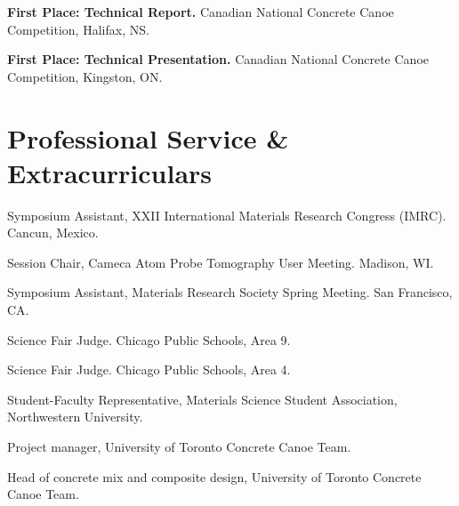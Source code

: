 \textbf{First Place: Technical Report.} Canadian National Concrete Canoe Competition, Halifax, NS.

\textbf{First Place: Technical Presentation.} Canadian National Concrete Canoe Competition, Kingston, ON.
\endgroup

\section*{Professional Service \& Extracurriculars}
Symposium Assistant, XXII International Materials Research Congress (IMRC). Cancun, Mexico.
\begingroup\setlength{\parskip}{0.1cm}

Session Chair, Cameca Atom Probe Tomography User Meeting. Madison, WI.

Symposium Assistant, Materials Research Society Spring Meeting. San Francisco, CA.

Science Fair Judge. Chicago Public Schools, Area 9.

Science Fair Judge. Chicago Public Schools, Area 4.

Student-Faculty Representative, Materials Science Student Association, Northwestern University.

Project manager, University of Toronto Concrete Canoe Team.

Head of concrete mix and composite design, University of Toronto Concrete Canoe Team.
\endgroup

